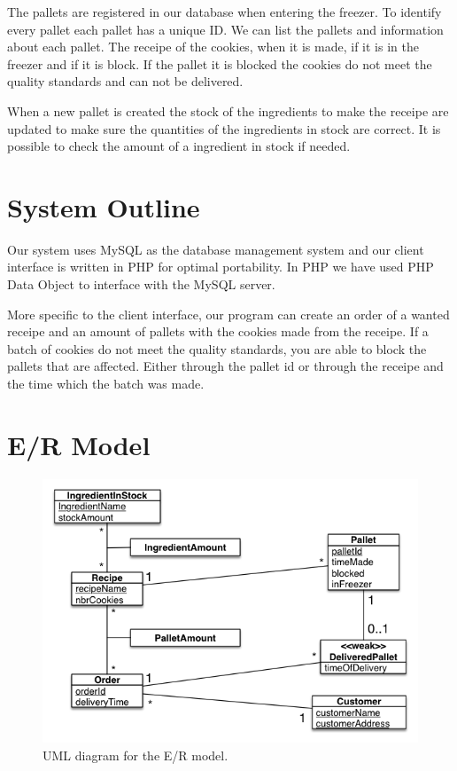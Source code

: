 \documentclass[a4paper]{article}
\begin{document}
The pallets are registered in our database when entering the freezer. To identify every pallet each pallet has a unique ID. We can list the pallets and information about each pallet. The receipe of the cookies, when it is made, if it is in the freezer and if it is block. If the pallet it is blocked the cookies do not meet the quality standards and can not be delivered.

When a new pallet is created the stock of the ingredients to make the receipe are updated to make sure the quantities of the ingredients in stock are correct. It is possible to check the amount of a ingredient in stock if needed.

%

\section{System Outline}
Our system uses MySQL as the database management system and our client interface is written in PHP for optimal portability. In PHP we have used PHP Data Object to interface with the MySQL server.


More specific to the client interface, our program can create an order of a wanted receipe and an amount of pallets with the cookies made from the receipe. If a batch of cookies do not meet the quality standards, you are able to block the pallets that are affected. Either through the pallet id or through the receipe and the time which the batch was made. 

\begin{description}
\item{}
\end{description}
\section{E/R Model}
\begin{figure}[!h]
\centering
\includegraphics[scale=0.7]{projectUMLFinal.png}
\caption{UML diagram for the E/R model.}
\label{uml}
\end{figure}
\end{document}
